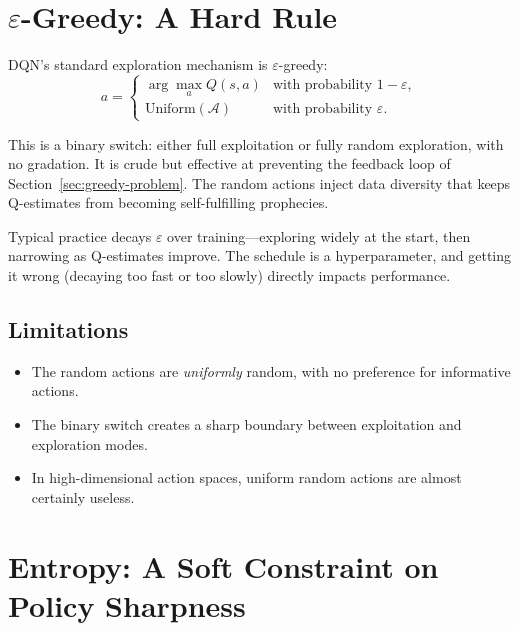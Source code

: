 \section{$\varepsilon$-Greedy: A Hard Rule}
\label{sec:epsilon-greedy}

DQN's standard exploration mechanism is $\varepsilon$-greedy:
\begin{equation}
  a =
  \begin{cases}
    \arg\max_a Q(s,a) & \text{with probability } 1 - \varepsilon, \\
    \text{Uniform}(\mathcal{A}) & \text{with probability } \varepsilon.
  \end{cases}
  \label{eq:eps-greedy}
\end{equation}

This is a binary switch: either full exploitation or fully random exploration, with no gradation. It is crude but effective at preventing the feedback loop of Section~\ref{sec:greedy-problem}. The random actions inject data diversity that keeps Q-estimates from becoming self-fulfilling prophecies.

Typical practice decays $\varepsilon$ over training---exploring widely at the start, then narrowing as Q-estimates improve. The schedule is a hyperparameter, and getting it wrong (decaying too fast or too slowly) directly impacts performance.

\subsection{Limitations}

\begin{itemize}
  \item The random actions are \emph{uniformly} random, with no preference for informative actions.
  \item The binary switch creates a sharp boundary between exploitation and exploration modes.
  \item In high-dimensional action spaces, uniform random actions are almost certainly useless.
\end{itemize}

\section{Entropy: A Soft Constraint on Policy Sharpness}
\label{sec:entropy-exploration}

